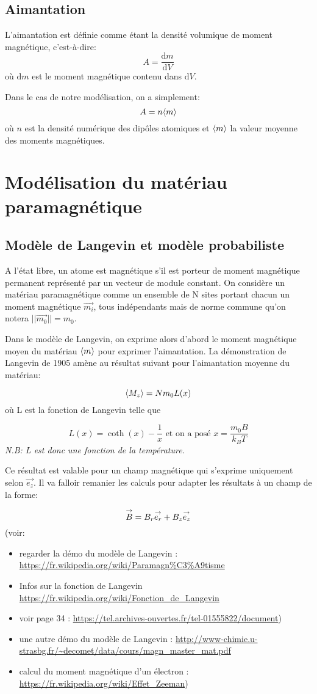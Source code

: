 \documentclass{article}
\begin{document}
\subsection{Aimantation}
L'aimantation est définie comme étant la densité volumique de moment magnétique, c'est-à-dire: $$A = \frac{\mathrm{d}m}{\mathrm{d}V}$$
où $\mathrm{d}m$ est le moment magnétique contenu dans $\mathrm{d}V$.

Dans le cas de notre modélisation, on a simplement:
$$A = n \valmoy{m}$$ où $n$ est la densité numérique des dipôles atomiques et $\valmoy{m}$ la valeur moyenne des moments magnétiques.

\section{Modélisation du matériau paramagnétique}
\subsection{Modèle de Langevin et modèle probabiliste}

A l’état libre, un atome est magnétique s’il est porteur de moment magnétique permanent représenté par un vecteur de module constant.
On considère un matériau paramagnétique comme un ensemble de N sites portant chacun un moment magnétique $\vec{m_i}$, tous indépendants mais de norme commune qu'on notera $||\vec{m_0} || = m_0$.

Dans le modèle de Langevin, on exprime alors d'abord le moment magnétique moyen du matériau $\valmoy{m}$ pour exprimer l'aimantation. La démonstration de Langevin de 1905 amène au résultat suivant pour l'aimantation moyenne du matériau:

$$\valmoy{M_z} = Nm_0L(x)$$
où L est la fonction de Langevin telle que

$$L(x) = \coth(x) - \frac{1}{x} \mbox{ et on a posé } x = \frac{m_0 B}{k_B T}$$
\emph{N.B: L est donc une fonction de la température.}

Ce résultat est valable pour un champ magnétique qui s'exprime uniquement selon $\vec{e_z}$. Il va falloir remanier les calculs pour adapter les résultats à un champ de la forme:

$$\overset{\to}{B} = B_r \overset{\to}{e_r} + B_z \overset{\to}{e_z}$$
(voir:
\begin{itemize}
    \item regarder la démo du modèle de Langevin  : \url{https://fr.wikipedia.org/wiki/Paramagn%C3%A9tisme}
    \item Infos sur la fonction de Langevin \url{https://fr.wikipedia.org/wiki/Fonction_de_Langevin}
    \item voir page 34 :  \url{https://tel.archives-ouvertes.fr/tel-01555822/document})
    \item une autre démo du modèle de Langevin : \url{http://www-chimie.u-strasbg.fr/~decomet/data/cours/magn_master_mat.pdf}
    \item calcul du moment magnétique d'un électron : \url{https://fr.wikipedia.org/wiki/Effet_Zeeman})
\end{itemize} 
\end{document}

